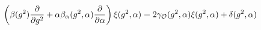 \begin{equation}  \label{d3}
\left(\beta(g^{2})\frac{\partial }{\partial g^{2}}+\alpha\beta_{%
\alpha}(g^{2},\alpha)\frac{\partial}{\partial \alpha}\right)\xi(g^{2},%
\alpha)=2\gamma_{\mathcal{O}}(g^{2},\alpha)\xi(g^{2},\alpha)+\delta(g^{2},%
\alpha)
\end{equation}

